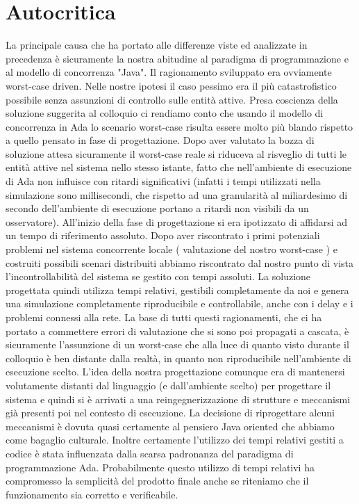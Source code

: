 \section{Autocritica}
La principale causa che ha portato alle differenze viste ed analizzate in precedenza è sicuramente la nostra abitudine al paradigma di programmazione e al modello di concorrenza "Java". Il ragionamento sviluppato era ovviamente worst-case driven.  Nelle nostre ipotesi il caso pessimo era il più catastrofistico possibile senza assunzioni di controllo sulle entità attive. Presa coscienza della soluzione suggerita al colloquio ci rendiamo conto che usando il modello di concorrenza in Ada lo scenario worst-case risulta essere molto più blando rispetto a quello pensato in fase di progettazione. Dopo aver valutato la bozza di soluzione attesa sicuramente il worst-case reale si riduceva al risveglio di tutti le entità attive nel sistema nello stesso istante, fatto che nell'ambiente di esecuzione di Ada non influisce con ritardi significativi (infatti i tempi utilizzati nella simulazione sono millisecondi, che rispetto ad una granularità al miliardesimo di secondo dell’ambiente di esecuzione portano a ritardi non visibili da un osservatore). All'inizio della fase di progettazione si era ipotizzato di affidarsi ad un tempo di riferimento assoluto. Dopo aver riscontrato i primi potenziali problemi nel sistema concorrente locale ( valutazione del nostro worst-case ) e costruiti possibili scenari distribuiti abbiamo riscontrato dal nostro punto di vista l'incontrollabilità del sistema se gestito con tempi assoluti. La soluzione progettata quindi utilizza tempi relativi, gestibili completamente da noi e genera  una simulazione completamente riproducibile e controllabile, anche con i delay e i problemi connessi alla rete. La base di tutti questi ragionamenti, che ci ha portato a commettere errori di valutazione che si sono poi propagati a cascata, è sicuramente l'assunzione di un worst-case che alla luce di quanto visto durante il colloquio è ben distante dalla realtà, in quanto non riproducibile nell'ambiente di esecuzione scelto. L'idea della nostra progettazione comunque era di mantenersi volutamente distanti dal linguaggio (e dall'ambiente scelto) per progettare il sistema e quindi si è arrivati a una reingegnerizzazione di strutture e meccanismi già presenti poi nel contesto di esecuzione. La decisione di riprogettare alcuni meccanismi è dovuta quasi certamente al pensiero Java oriented che abbiamo come bagaglio culturale. Inoltre certamente l’utilizzo dei tempi relativi gestiti a codice è stata influenzata dalla scarsa padronanza del paradigma di programmazione Ada. Probabilmente questo utilizzo di tempi relativi ha compromesso la semplicità del prodotto finale anche se riteniamo che il funzionamento sia corretto e verificabile.\\
